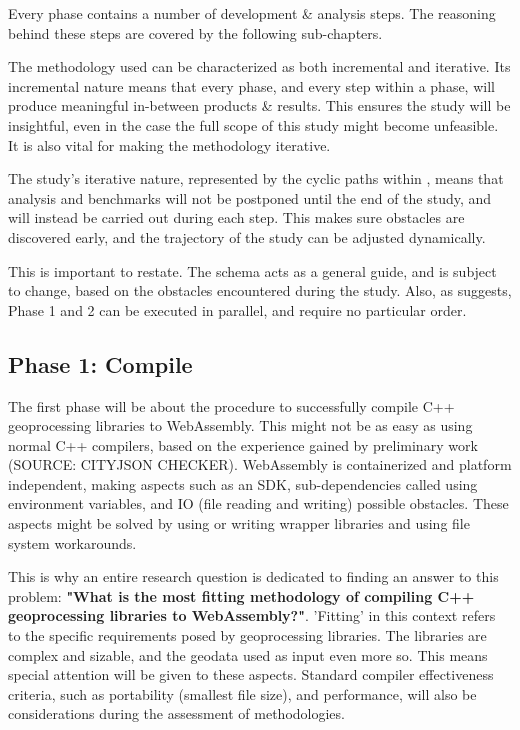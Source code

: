 
Every phase contains a number of development \& analysis steps. The reasoning behind these steps are covered by the following sub-chapters.  

The methodology used can be characterized as both incremental and iterative. Its incremental nature means that every phase, and every step within a phase, will produce meaningful in-between products \& results. This ensures the study will be insightful, even in the case the full scope of this study might become unfeasible. It is also vital for making the methodology iterative. 

The study's iterative nature, represented by the cyclic paths within , means that analysis and benchmarks will not be postponed until the end of the study, and will instead be carried out during each step. This makes sure obstacles are discovered early, and the trajectory of the study can be adjusted dynamically.  

This is important to restate. The schema acts as a general guide, and is subject to change, based on the obstacles encountered during the study. Also, as  suggests, Phase 1 and 2 can be executed in parallel, and require no particular order. 


\subsection{Phase 1: Compile}

The first phase will be about the procedure to successfully compile C++ geoprocessing libraries to WebAssembly. This might not be as easy as using normal C++ compilers, based on the experience gained by preliminary work (SOURCE: CITYJSON CHECKER). WebAssembly is containerized and platform independent, making aspects such as an SDK, sub-dependencies called using environment variables, and IO (file reading and writing) possible obstacles. These aspects might be solved by using or writing wrapper libraries and using file system workarounds. 

This is why an entire research question is dedicated to finding an answer to this problem: \textbf{"What is the most fitting methodology of compiling C++ geoprocessing libraries to WebAssembly?"}. 'Fitting' in this context refers to the specific requirements posed by geoprocessing libraries. The libraries are complex and sizable, and the geodata used as input even more so. This means special attention will be given to these aspects. Standard compiler effectiveness criteria, such as portability (smallest file size), and performance, will also be considerations during the assessment of methodologies.  

